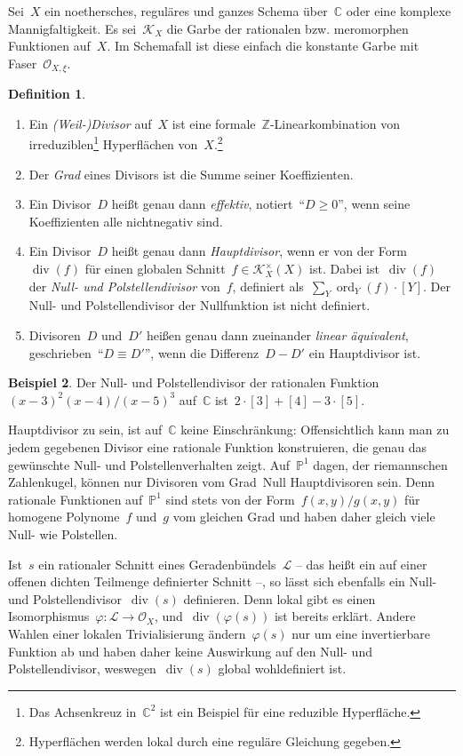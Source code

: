 \documentclass[a4paper,ngerman,12pt]{scrartcl}
\theoremstyle{definition}
\newtheorem{defn}{Definition}[section]
\newtheorem{ex}[defn]{Beispiel}
\theoremstyle{plain}
\theoremstyle{remark}
\newcommand{\CC}{\mathbb{C}}
\newcommand{\ZZ}{\mathbb{Z}}
\newcommand{\PP}{\mathbb{P}}
\newcommand{\K}{\mathcal{K}}
\renewcommand{\L}{\mathcal{L}}
\renewcommand{\O}{\mathcal{O}}
\renewcommand{\div}{\operatorname{div}}
\newcommand{\ord}{\operatorname{ord}}
\begin{document}
Sei~$X$ ein noethersches, reguläres und ganzes Schema über~$\CC$ oder eine
komplexe Mannigfaltigkeit. Es sei~$\K_X$ die Garbe der rationalen bzw.
meromorphen Funktionen auf~$X$. Im Schemafall ist diese einfach die konstante
Garbe mit Faser~$\O_{X,\xi}$.

\begin{defn}\begin{enumerate}
\item Ein \emph{(Weil-)Divisor} auf~$X$ ist eine
formale~$\ZZ$-Linearkombination von irreduziblen\footnote{Das Achsenkreuz
in~$\CC^2$ ist ein Beispiel für eine reduzible Hyperfläche.} Hyperflächen
von~$X$.\footnote{Hyperflächen werden lokal durch eine reguläre Gleichung
gegeben.}
\item Der \emph{Grad} eines Divisors ist die Summe seiner Koeffizienten.
\item Ein Divisor~$D$ heißt genau dann \emph{effektiv}, notiert~"`$D \geq 0$"',
wenn seine Koeffizienten alle nichtnegativ sind.
\item Ein Divisor~$D$ heißt genau dann \emph{Hauptdivisor}, wenn er von der
Form~$\div(f)$ für einen globalen Schnitt~$f \in \K_X^\times(X)$ ist. Dabei
ist~$\div(f)$ der \emph{Null- und Polstellendivisor} von~$f$, definiert
als~$\sum_Y \ord_Y(f) \cdot [Y]$. Der Null- und Polstellendivisor der
Nullfunktion ist nicht definiert.
\item Divisoren~$D$ und~$D'$ heißen genau dann zueinander \emph{linear
äquivalent}, geschrieben~"`$D \equiv D'$"', wenn die Differenz~$D - D'$ ein
Hauptdivisor ist.
\end{enumerate}
\end{defn}

\begin{ex}Der Null- und Polstellendivisor der rationalen Funktion~$(x-3)^2
(x-4) / (x-5)^3$ auf~$\CC$ ist~$2 \cdot [3] + [4] - 3 \cdot [5]$.\end{ex}

Hauptdivisor zu sein, ist auf~$\CC$ keine Einschränkung: Offensichtlich kann
man zu jedem gegebenen Divisor eine rationale Funktion konstruieren, die genau
das gewünschte Null- und Polstellenverhalten zeigt. Auf~$\PP^1$ dagen, der
riemannschen Zahlenkugel, können nur Divisoren vom Grad~Null Hauptdivisoren
sein. Denn rationale Funktionen auf~$\PP^1$ sind stets von der
Form~$f(x,y)/g(x,y)$ für homogene Polynome~$f$ und~$g$ vom gleichen Grad
und haben daher gleich viele Null- wie Polstellen.

Ist~$s$ ein rationaler Schnitt eines Geradenbündels~$\L$ -- das heißt ein auf
einer offenen dichten Teilmenge definierter Schnitt --, so lässt sich ebenfalls
ein Null- und Polstellendivisor~$\div(s)$ definieren. Denn lokal gibt es einen
Isomorphismus~$\varphi : \L \to \O_X$, und~$\div(\varphi(s))$ ist bereits
erklärt. Andere Wahlen einer lokalen Trivialisierung ändern~$\varphi(s)$ nur um
eine invertierbare Funktion ab und haben daher keine Auswirkung auf den Null-
und Polstellendivisor, weswegen~$\div(s)$ global wohldefiniert ist.
\end{document}
